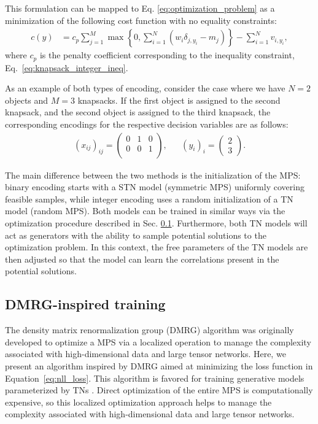 This formulation can be mapped to Eq. \eqref{eq:optimization_problem} as a minimization of the following cost function with no equality constraints:
\begin{align*}
    c(y) & = c_p \sum_{j=1}^{M}\max\left\{0, \sum_{i=1}^{N}(w_{i}\delta_{j, y_i}-m_j)\right\} - \sum_{i=1}^{N}v_{i,y_i},
\end{align*}
where $c_p$ is the penalty coefficient corresponding to the inequality constraint, Eq.~\eqref{eq:knapsack_integer_ineq}.

As an example of both types of encoding, consider the case where we have $N=2$ objects and $M=3$ knapsacks.
If the first object is assigned to the second knapsack, and the second object is assigned to the third knapsack, the corresponding encodings for the respective decision variables are as follows:
\begin{align*}
    (x_{ij})_{ij} =  
    \begin{pmatrix}
     0   & 1   & 0 \\
     0   & 0   & 1 \\
    \end{pmatrix}, 
    & {} &
    (y_i)_{i} = \begin{pmatrix} 2 \\ 3 \end{pmatrix}.
\end{align*}

The main difference between the two methods is the initialization of the MPS: binary encoding starts with a STN model (symmetric MPS) uniformly covering feasible samples, while integer encoding uses a random initialization of a TN model (random MPS). Both models can be trained in similar ways via the optimization procedure described in Sec. \ref{sec:dmrg}. Furthermore, both TN models will act as generators with the ability to sample potential solutions to the optimization problem. In this context, the free parameters of the TN models are then adjusted so that the model can learn the correlations present in the potential solutions. 

\subsection{DMRG-inspired training}\label{sec:dmrg} 

The density matrix renormalization group (DMRG) algorithm \cite{RevModPhys.77.259, PhysRevB.48.10345} was originally developed to optimize a MPS via a localized operation to manage the complexity associated with high-dimensional data and large tensor networks. Here, we present an algorithm inspired by DMRG aimed at minimizing the loss function in Equation~\eqref{eq:nll_loss}. This algorithm is favored for training generative models parameterized by TNs \cite{stoudenmire2016supervised}. Direct optimization of the entire MPS is computationally expensive, so this localized optimization approach helps to manage the complexity associated with high-dimensional data and large tensor networks.


